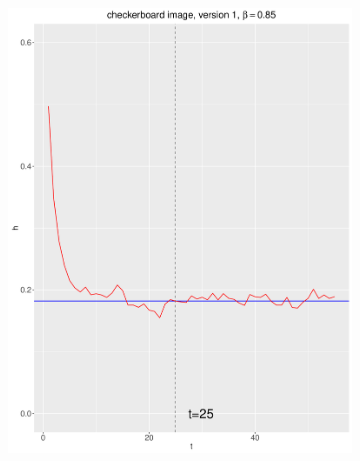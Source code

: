 \documentclass[12pt, oneside]{article}   	%
\begin{document}
\begin{figure}[H]
\begin{subfigure}[b]{0.475\textwidth}
            \includegraphics[width=\textwidth, height=0.32\textheight]{check_v1_85.pdf}
        \end{subfigure} \
\end{figure}
\end{document}
